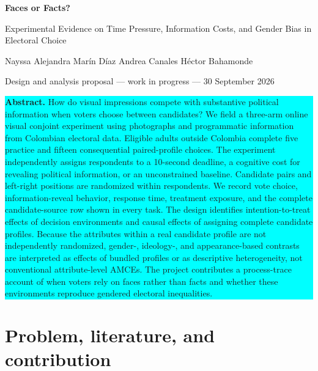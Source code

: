 \documentclass[10pt]{article}
\begin{document}
\begin{center}
{\LARGE\bfseries Faces or Facts?}\par
\vspace{1pt}
{\large Experimental Evidence on Time Pressure, Information Costs, and Gender Bias in Electoral Choice}\par
\vspace{3pt}
{\normalsize Nayssa Alejandra Mar\'in D\'iaz \quad Andrea Canales \quad H\'ector Bahamonde}\par
\vspace{1pt}
{\small Design and analysis proposal --- work in progress --- 30 September 2026}
\end{center}

\vspace{-3pt}
\noindent\colorbox{cyan}{\parbox{0.978\linewidth}{\small
\textbf{Abstract.} How do visual impressions compete with substantive political information when voters choose between candidates? We field a three-arm online visual conjoint experiment using photographs and programmatic information from Colombian electoral data. Eligible adults outside Colombia complete five practice and fifteen consequential paired-profile choices. The experiment independently assigns respondents to a 10-second deadline, a cognitive cost for revealing political information, or an unconstrained baseline. Candidate pairs and left-right positions are randomized within respondents. We record vote choice, information-reveal behavior, response time, treatment exposure, and the complete candidate-source row shown in every task. The design identifies intention-to-treat effects of decision environments and causal effects of assigning complete candidate profiles. Because the attributes within a real candidate profile are not independently randomized, gender-, ideology-, and appearance-based contrasts are interpreted as effects of bundled profiles or as descriptive heterogeneity, not conventional attribute-level AMCEs. The project contributes a process-trace account of when voters rely on faces rather than facts and whether these environments reproduce gendered electoral inequalities.}}

\section{Problem, literature, and contribution}
\end{document}
